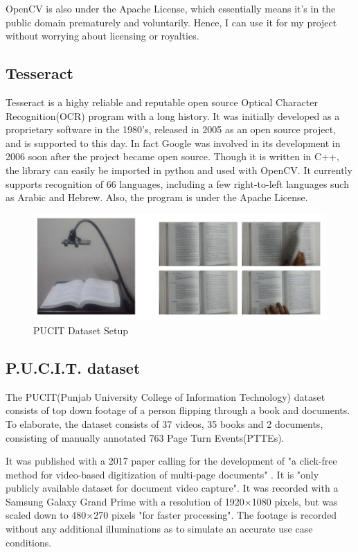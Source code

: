 \documentclass[10pt,twocolumn]{article}
\begin{document}
OpenCV is also under the Apache License, which essentially means it's in the public domain prematurely and voluntarily. Hence, I can use it for my project without worrying about licensing or royalties.\newline

\subsection{Tesseract}
Tesseract is a highy reliable and reputable open source Optical Character Recognition(OCR) program with a long history. It was initially developed as a proprietary software in the 1980's, released in 2005 as an open source project, and is supported to this day. In fact Google was involved in its development in 2006 soon after the project became open source\cite{vincent2006}. Though it is written in C++, the library can easily be imported in python and used with OpenCV. It currently supports recognition of 66 languages, including a few right-to-left languages such as Arabic and Hebrew. Also, the program is under the Apache License.\newline

\begin{figure}
    \centering
    \includegraphics[width=1\linewidth]{PUCIT.png}
    \caption{PUCIT Dataset Setup}
    \label{fig:enter-label}
\end{figure}

\subsection{P.U.C.I.T. dataset}
The PUCIT(Punjab University College of Information Technology) dataset consists of top down footage of a person flipping through a book and documents. To elaborate, the dataset consists of 37 videos, 35 books and 2 documents, consisting of manually annotated 763 Page Turn Events(PTTEs)\cite{tariq2017}.\newline

It was published with a 2017 paper calling for the development of "a click-free method for video-based digitization of multi-page documents" \cite{tariq2017}. It is "only publicly available dataset for document video capture"\cite{wigington2024}. It was recorded with a Samsung Galaxy Grand Prime with a resolution of 1920×1080 pixels, but was scaled down to 480×270 pixels "for faster processing". The footage is recorded without any additional illuminations as to simulate an accurate use case conditions.\newline
\end{document}
